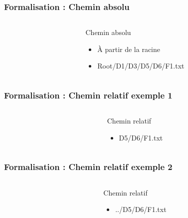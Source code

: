 \documentclass[handout, table,svgnames,hyperref={pdfpagemode=FullScreen}]{beamer}
\begin{document}
\begin{frame}
		\frametitle{Formalisation : Chemin absolu}
		\begin{columns}
			\begin{column}[l]{5cm}
				
			\end{column}
			\begin{column}[r]{5cm}
				\begin{block}{Chemin absolu}
					\begin{itemize}
						\item À partir de la racine 
						\item Root/D1/D3/D5/D6/F1.txt
					\end{itemize}
				\end{block}
			\end{column}
		\end{columns}
\end{frame}

\begin{frame}
		\frametitle{Formalisation : Chemin relatif exemple 1}
		\begin{columns}
			\begin{column}[l]{5cm}
				
			\end{column}
			\begin{column}[r]{5cm}
				\begin{block}{Chemin relatif}
					\begin{itemize}
						\item D5/D6/F1.txt
					\end{itemize}
				\end{block}
			\end{column}
		\end{columns}
\end{frame}

\begin{frame}
		\frametitle{Formalisation : Chemin relatif exemple 2}
		\begin{columns}
			\begin{column}[l]{5cm}
				
			\end{column}
			\begin{column}[r]{5cm}
				\begin{block}{Chemin relatif}
					\begin{itemize}
						\item ../D5/D6/F1.txt
					\end{itemize}
				\end{block}
			\end{column}
		\end{columns}
\end{frame}
\end{document}
